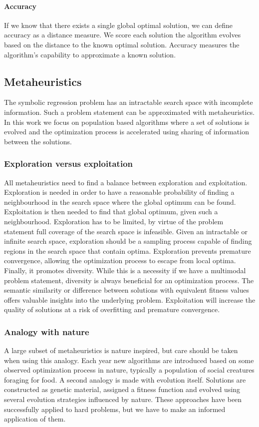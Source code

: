\paragraph{Accuracy}
If we know that there exists a single global optimal solution, we can define accuracy as a distance measure. We score each solution the algorithm evolves based on the distance to the known optimal solution. Accuracy measures the algorithm's capability to approximate a known solution. 

\subsection{Metaheuristics}
The symbolic regression problem has an intractable search space with incomplete information. Such a problem statement can be approximated with metaheuristics. In this work we focus on population based algorithms where a set of solutions is evolved and the optimization process is accelerated using sharing of information between the solutions.

\subsubsection{Exploration versus exploitation}
All metaheuristics need to find a balance between exploration and exploitation. Exploration is needed in order to have a reasonable probability of finding a neighbourhood in the search space where the global optimum can be found. Exploitation is then needed to find that global optimum, given such a neighbourhood. Exploration has to be limited, by virtue of the problem statement full coverage of the search space is infeasible. Given an intractable or infinite search space, exploration should be a sampling process capable of finding regions in the search space that contain optima. Exploration prevents premature convergence, allowing the optimization process to escape from local optima. Finally, it promotes diversity. While this is a necessity if we have a multimodal problem statement, diversity is always beneficial for an optimization process. The semantic similarity or difference between solutions with equivalent fitness values offers valuable insights into the underlying problem.
Exploitation will increase the quality of solutions at a risk of overfitting and premature convergence. 

\subsubsection{Analogy with nature}
A large subset of metaheuristics is nature inspired, but care should be taken when using this analogy. Each year new algorithms are introduced based on some observed optimization process in nature, typically a population of social creatures foraging for food. A second analogy is made with evolution itself. Solutions are constructed as genetic material, assigned a fitness function and evolved using several evolution strategies influenced by nature. These approaches have been successfully applied to hard problems, but we have to make an informed application of them.
